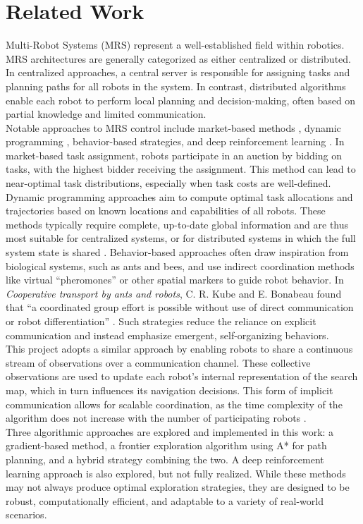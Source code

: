 \section{Related Work}
Multi-Robot Systems (MRS) represent a well-established field within robotics. MRS architectures are generally categorized as either centralized or distributed. In centralized approaches, a central server is responsible for assigning tasks and planning paths for all robots in the system. 
In contrast, distributed algorithms enable each robot to perform local planning and decision-making, often based on partial knowledge and limited communication. \\

Notable approaches to MRS control include market-based methods \cite{trigui2014market}, dynamic programming \cite{kato2011dp}, behavior-based strategies, and deep reinforcement learning \cite{huttenrauch2019deep-swarm}. In market-based task assignment, robots participate in an auction by bidding on tasks, with the highest bidder receiving the assignment. This method can lead to near-optimal task distributions, especially when task costs are well-defined. Dynamic programming approaches aim to compute optimal task allocations and trajectories based on known locations and capabilities of all robots. These methods typically require complete, up-to-date global information and are thus most suitable for centralized systems, or for distributed systems in which the full system state is shared \cite{multi-robot-search-moving-target}. Behavior-based approaches often draw inspiration from biological systems, such as ants and bees, and use indirect coordination methods like virtual “pheromones” or other spatial markers to guide robot behavior. In \textit{Cooperative transport by ants and robots}, C. R. Kube and E. Bonabeau found that “a coordinated group effort is possible without use of direct communication or robot differentiation” \cite{kube2000cooperative-ants}. Such strategies reduce the reliance on explicit communication and instead emphasize emergent, self-organizing behaviors. \\

This project adopts a similar approach by enabling robots to share a continuous stream of observations over a communication channel. These collective observations are used to update each robot’s internal representation of the search map, which in turn influences its navigation decisions. This form of implicit communication allows for scalable coordination, as the time complexity of the algorithm does not increase with the number of participating robots \cite{multi-robot-search-moving-target}. \\

Three algorithmic approaches are explored and implemented in this work: a gradient-based method, a frontier exploration algorithm using A* for path planning, and a hybrid strategy combining the two. A deep reinforcement learning approach is also explored, but not fully realized. While these methods may not always produce optimal exploration strategies, they are designed to be robust, computationally efficient, and adaptable to a variety of real-world scenarios.

